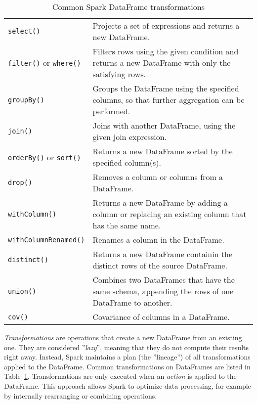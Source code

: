 \begin{table}
\renewcommand{\arraystretch}{1.25}

\begin{tabularx}{\textwidth}{l|X} \hline
\texttt{select()} & Projects a set of expressions and returns a new DataFrame. \\
\texttt{filter()} or \texttt{where()} & Filters rows using the given condition and returns a new DataFrame with only the satisfying rows. \\
\texttt{groupBy()} & Groups the DataFrame using the specified columns, so that further aggregation can be performed. \\
\texttt{join()} & Joins with another DataFrame, using the given join expression. \\
\texttt{orderBy()} or \texttt{sort()} & Returns a new DataFrame sorted by the specified column(s).\\
\texttt{drop()} & Removes a column or columns from a DataFrame.\\
\texttt{withColumn()} & Returns a new DataFrame by adding a column or replacing an existing column that has the same name.\\
\texttt{withColumnRenamed()} & Renames a column in the DataFrame. \\
\texttt{distinct()} & Returns a new DataFrame containin the distinct rows of the source DataFrame.\\
\texttt{union()} & Combines two DataFrames that have the same schema, appending the rows of one DataFrame to another.\\
\texttt{cov()} & Covariance of columns in a DataFrame.\\ \hline
\end{tabularx}
\caption{Common Spark DataFrame transformations}
\label{tab:sparktransformations}
\end{table}


\emph{Transformations} are operations that create a new DataFrame from an existing one. They are considered ''\emph{lazy}'', meaning that they do not compute their results right away. Instead, Spark maintains a plan (the ''lineage'') of all transformations applied to the DataFrame. Common transformations on DataFrames are listed in Table~\ref{tab:sparktransformations}. Transformations are only executed when an \emph{action} is applied to the DataFrame. This approach allows Spark to optimize data processing, for example by internally rearranging or combining operations.

